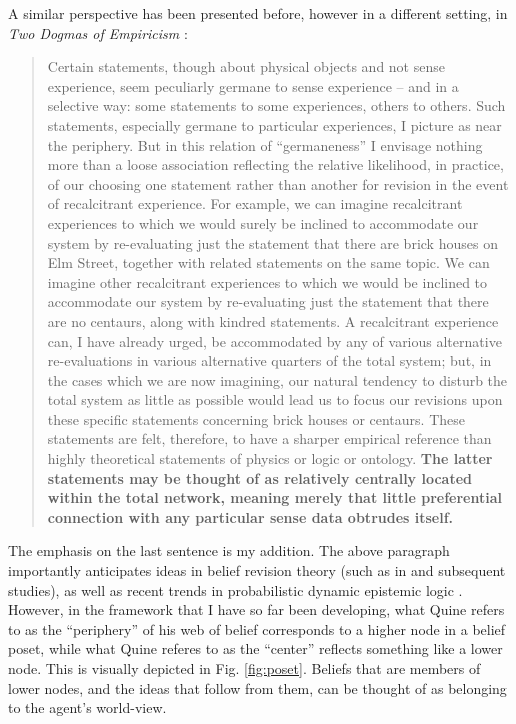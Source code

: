 \documentclass[11pt]{article}
\numberwithin{equation}{subsection}
\begin{document}
A similar perspective has been presented before, however in a
different setting, in \emph{Two Dogmas of Empiricism}
\citep{quine_two_1951}:
\begin{quote}
{Certain statements, though about physical objects and not sense
  experience, seem peculiarly germane to sense experience -- and in a
  selective way: some statements to some experiences, others to
  others. Such statements, especially germane to particular
  experiences, I picture as near the periphery. But in this relation
  of ``germaneness'' I envisage nothing more than a loose association
  reflecting the relative likelihood, in practice, of our choosing one
  statement rather than another for revision in the event of
  recalcitrant experience. For example, we can imagine recalcitrant
  experiences to which we would surely be inclined to accommodate our
  system by re-evaluating just the statement that there are brick
  houses on Elm Street, together with related statements on the same
  topic. We can imagine other recalcitrant experiences to which we
  would be inclined to accommodate our system by re-evaluating just
  the statement that there are no centaurs, along with kindred
  statements. A recalcitrant experience can, I have already urged, be
  accommodated by any of various alternative re-evaluations in various
  alternative quarters of the total system; but, in the cases which we
  are now imagining, our natural tendency to disturb the total system
  as little as possible would lead us to focus our revisions upon
  these specific statements concerning brick houses or centaurs. These
  statements are felt, therefore, to have a sharper empirical
  reference than highly theoretical statements of physics or logic or
  ontology. \textbf{The latter statements may be thought of as
    relatively centrally located within the total network, meaning
    merely that little preferential connection with any particular
    sense data obtrudes itself.} }
\end{quote}

The emphasis on the last sentence is my addition.  The above paragraph
importantly anticipates ideas in belief revision theory (such as in
\citet{alchourron_logic_1985} and subsequent studies), as well as
recent trends in probabilistic dynamic epistemic logic \citep[such as
in][etc.]{van_benthem_conditional_2003,van_benthem_dynamic_2009,baltag_probabilistic_2008,kooi_probabilistic_2003}.
However, in the framework that I have so far been developing, what
Quine refers to as the ``periphery'' of his web of belief corresponds
to a higher node in a belief poset, while what Quine referes to as the
``center'' reflects something like a lower node.  This is visually
depicted in Fig. \ref{fig:poset}.  Beliefs that are members of lower
nodes, and the ideas that follow from them, can be thought of as
belonging to the agent's world-view.
\end{document}
